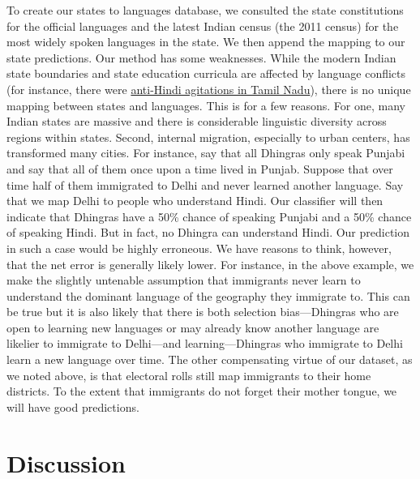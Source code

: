 \documentclass[11pt,  letterpaper]{article}
\begin{document}
To create our states to languages database, we consulted the state constitutions for the official languages and the latest Indian census (the 2011 census) for the most widely spoken languages in the state. We then append the mapping to our state predictions. Our method has some weaknesses. While the modern Indian state boundaries and state education curricula are affected by language conflicts (for instance, there were \href{https://en.wikipedia.org/wiki/Anti-Hindi_agitations_of_Tamil_Nadu}{anti-Hindi agitations in Tamil Nadu}), there is no unique mapping between states and languages. This is for a few reasons. For one, many Indian states are massive and there is considerable linguistic diversity across regions within states. Second, internal migration, especially to urban centers, has transformed many cities. For instance, say that all Dhingras only speak Punjabi and say that all of them once upon a time lived in Punjab. Suppose that over time half of them immigrated to Delhi and never learned another language. Say that we map Delhi to people who understand Hindi. Our classifier will then indicate that Dhingras have a 50\% chance of speaking Punjabi and a 50\% chance of speaking Hindi. But in fact, no Dhingra can understand Hindi. Our prediction in such a case would be highly erroneous. We have reasons to think, however, that the net error is generally likely lower. For instance, in the above example, we make the slightly untenable assumption that immigrants never learn to understand the dominant language of the geography they immigrate to. This can be true but it is also likely that there is both selection bias—Dhingras who are open to learning new languages or may already know another language are likelier to immigrate to Delhi—and learning—Dhingras who immigrate to Delhi learn a new language over time. The other compensating virtue of our dataset, as we noted above, is that electoral rolls still map immigrants to their home districts. To the extent that immigrants do not forget their mother tongue, we will have good predictions.

\section{Discussion}
\end{document}

